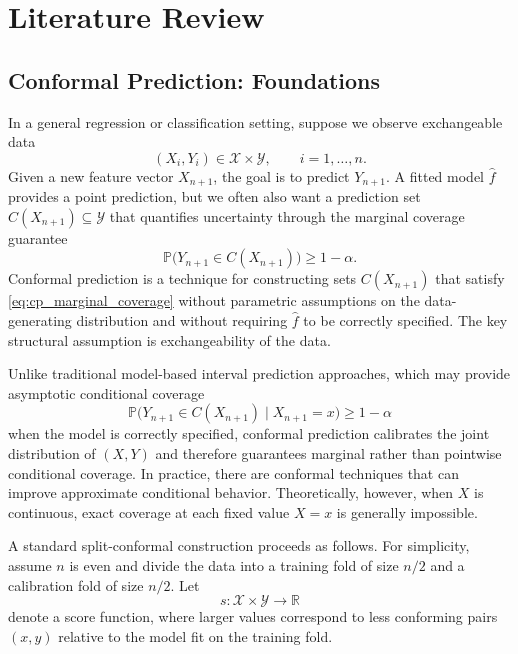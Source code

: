 \documentclass[12pt]{article}
\makeatletter
\let\thesis@chapter\section
\let\thesis@section\subsection
\let\thesis@subsection\subsubsection
\newcommand{\chapter}{\thesis@chapter}
\renewcommand{\section}{\thesis@section}
\renewcommand{\subsection}{\thesis@subsection}
\makeatother
\begin{document}
\newpage
{}


\chapter{Literature Review}

\section{Conformal Prediction: Foundations}

In a general regression or classification setting, suppose we observe exchangeable data
\[
(X_i,Y_i)\in\mathcal{X}\times\mathcal{Y}, \qquad i=1,\ldots,n.
\]
Given a new feature vector $X_{n+1}$, the goal is to predict $Y_{n+1}$. A fitted model $\hat f$ provides a point prediction, but we often also want a prediction set $C(X_{n+1})\subseteq\mathcal{Y}$ that quantifies uncertainty through the marginal coverage guarantee
\begin{equation}
\mathbb{P}\bigl(Y_{n+1}\in C(X_{n+1})\bigr)\ge 1-\alpha.
\label{eq:cp_marginal_coverage}
\end{equation}
Conformal prediction is a technique for constructing sets $C(X_{n+1})$ that satisfy \eqref{eq:cp_marginal_coverage} without parametric assumptions on the data-generating distribution and without requiring $\hat f$ to be correctly specified. The key structural assumption is exchangeability of the data. \citep{angelopoulos2024theoretical,vovk2022algorithmic}

Unlike traditional model-based interval prediction approaches, which may provide asymptotic conditional coverage
\[
\mathbb{P}\bigl(Y_{n+1}\in C(X_{n+1})\mid X_{n+1}=x\bigr)\ge 1-\alpha
\]
when the model is correctly specified, conformal prediction calibrates the joint distribution of $(X,Y)$ and therefore guarantees marginal rather than pointwise conditional coverage. In practice, there are conformal techniques that can improve approximate conditional behavior. Theoretically, however, when $X$ is continuous, exact coverage at each fixed value $X=x$ is generally impossible.

A standard split-conformal construction proceeds as follows. For simplicity, assume $n$ is even and divide the data into a training fold of size $n/2$ and a calibration fold of size $n/2$. Let
\[
s:\mathcal{X}\times\mathcal{Y}\to\mathbb{R}
\]
denote a score function, where larger values correspond to less conforming pairs $(x,y)$ relative to the model fit on the training fold.
\end{document}
